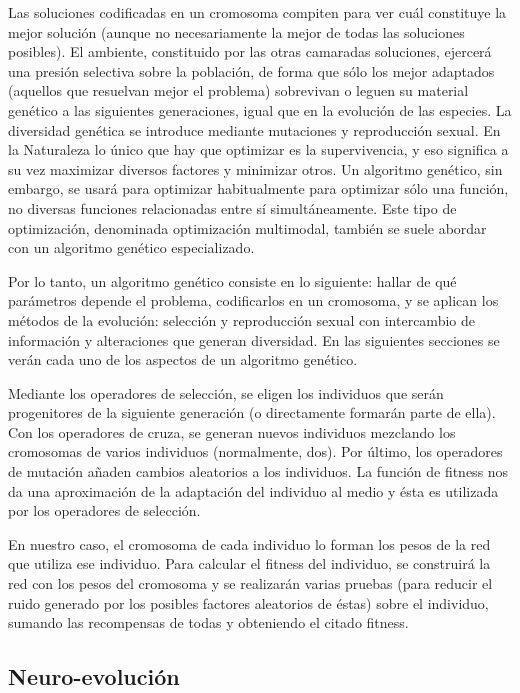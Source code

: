 \documentclass[a4paper,11pt]{article}
\begin{document}
 Las soluciones codificadas en un cromosoma compiten para ver cu\'al constituye la mejor soluci\'on (aunque no necesariamente la mejor de todas las soluciones posibles). El ambiente, constituido por las otras camaradas soluciones, ejercer\'a una presi\'on selectiva sobre la poblaci\'on, de forma que s\'olo los mejor adaptados (aquellos que resuelvan mejor el problema) sobrevivan o leguen su material gen\'etico a las siguientes generaciones, igual que en la evoluci\'on de las especies. La diversidad gen\'etica se introduce mediante mutaciones y reproducci\'on sexual. En la Naturaleza lo \'unico que hay que optimizar es la supervivencia, y eso significa a su vez maximizar diversos factores y minimizar otros. Un algoritmo gen\'etico, sin embargo, se usar\'a para optimizar habitualmente para optimizar s\'olo una funci\'on, no diversas funciones relacionadas entre s\'i simult\'aneamente. Este tipo de optimizaci\'on, denominada optimizaci\'on multimodal, tambi\'en se suele abordar con un algoritmo gen\'etico especializado.

 Por lo tanto, un algoritmo gen\'etico consiste en lo siguiente: hallar de qu\'e par\'ametros depende el problema, codificarlos en un cromosoma, y se aplican los m\'etodos de la evoluci\'on: selecci\'on y reproducci\'on sexual con intercambio de informaci\'on y alteraciones que generan diversidad. En las siguientes secciones se ver\'an cada uno de los aspectos de un algoritmo gen\'etico.

 Mediante los operadores de selecci\'on, se eligen los individuos que ser\'an progenitores de la siguiente generaci\'on (o directamente formar\'an parte de ella). Con los operadores de cruza, se generan nuevos individuos mezclando los cromosomas de varios individuos (normalmente, dos). Por \'ultimo, los operadores de mutaci\'on a\~naden cambios aleatorios a los individuos. La funci\'on de fitness nos da una aproximaci\'on de la adaptaci\'on del individuo al medio y \'esta es utilizada por los operadores de selecci\'on.

 En nuestro caso, el cromosoma de cada individuo lo forman los pesos de la red que utiliza ese individuo. Para calcular el fitness del individuo, se construir\'a la red con los pesos del cromosoma y se realizar\'an varias pruebas (para reducir el ruido generado por los posibles factores aleatorios de \'estas) sobre el individuo, sumando las recompensas de todas y obteniendo el citado fitness.

\subsection{Neuro-evoluci\'on}\label{basTeoNeuro}
\end{document}
